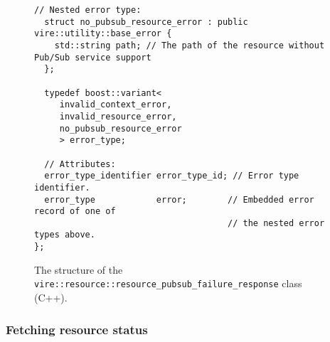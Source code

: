 \begin{itemize}
\begin{figure}[h]
\begin{Verbatim}[frame=single,xleftmargin=0.cm,label=\fbox{C++}]
  // Nested error type:
  struct no_pubsub_resource_error : public vire::utility::base_error {
    std::string path; // The path of the resource without Pub/Sub service support
  };

  typedef boost::variant<
     invalid_context_error,
     invalid_resource_error,
     no_pubsub_resource_error
     > error_type;

  // Attributes:
  error_type_identifier error_type_id; // Error type identifier.
  error_type            error;        // Embedded error record of one of
                                      // the nested error types above.
};
\end{Verbatim}
\normalsize
\caption{The structure of the \texttt{vire::resource::resource\_pubsub\_failure\_response}
  class (C++).}
\label{fig-app-payload-resource_pubsub_failure_response}
\end{figure}

\end{itemize}

\vfill
\pagebreak
\clearpage

\subsubsection{Fetching resource status}

\begin{center}
\end{center}

